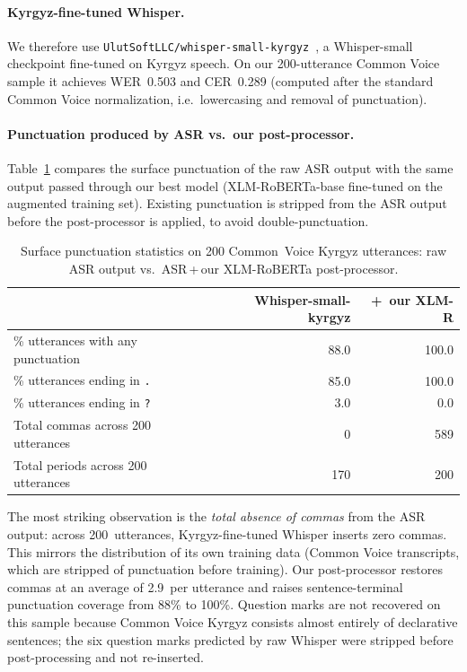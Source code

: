 \documentclass[manuscript, review]{acmart}
\begin{document}
\paragraph{Kyrgyz-fine-tuned Whisper.} We therefore use \texttt{UlutSoftLLC/whisper-small-kyrgyz}~\cite{ulutsoft2024whisper}, a Whisper-small checkpoint fine-tuned on Kyrgyz speech. On our 200-utterance Common Voice sample it achieves WER~0.503 and CER~0.289 (computed after the standard Common Voice normalization, i.e.\ lowercasing and removal of punctuation).

\paragraph{Punctuation produced by ASR vs.\ our post-processor.} Table~\ref{tab:asr-integration} compares the surface punctuation of the raw ASR output with the same output passed through our best model (XLM-RoBERTa-base fine-tuned on the augmented training set). Existing punctuation is stripped from the ASR output before the post-processor is applied, to avoid double-punctuation.

\begin{table}[t]
\centering
\small
\caption{Surface punctuation statistics on 200 Common~Voice Kyrgyz utterances: raw ASR output vs.\ ASR\,+\,our XLM-RoBERTa post-processor.}
\label{tab:asr-integration}
\begin{tabular}{lrr}
\toprule
 & \textbf{Whisper-small-kyrgyz} & \textbf{+\ our XLM-R} \\
\midrule
\% utterances with any punctuation    & 88.0 & 100.0 \\
\% utterances ending in \texttt{.}    & 85.0 & 100.0 \\
\% utterances ending in \texttt{?}    &  3.0 &   0.0 \\
Total commas across 200 utterances    &  0   & 589 \\
Total periods across 200 utterances   & 170  & 200 \\
\bottomrule
\end{tabular}
\end{table}

The most striking observation is the \emph{total absence of commas} from the ASR output: across 200~utterances, Kyrgyz-fine-tuned Whisper inserts zero commas. This mirrors the distribution of its own training data (Common Voice transcripts, which are stripped of punctuation before training). Our post-processor restores commas at an average of 2.9~per utterance and raises sentence-terminal punctuation coverage from 88\% to 100\%. Question marks are not recovered on this sample because Common Voice Kyrgyz consists almost entirely of declarative sentences; the six question marks predicted by raw Whisper were stripped before post-processing and not re-inserted.
\end{document}
